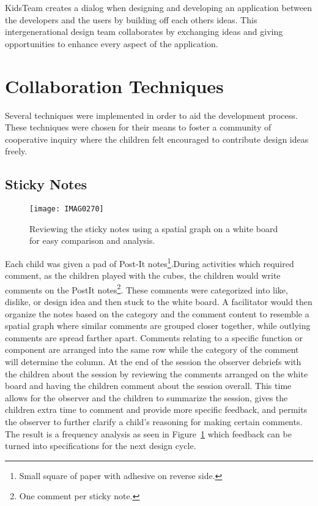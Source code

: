 KidsTeam creates a dialog when designing and developing an application between the developers and the users by building off each others ideas. This intergenerational design team collaborates by exchanging ideas and giving opportunities to enhance every aspect of the application. 


\section{Collaboration Techniques}
Several techniques were implemented in order to aid the development process. These techniques were chosen for their means to foster a community of cooperative inquiry where the children felt encouraged to contribute design ideas freely. \cite{journalsjcalScottMI03}\cite{Colella98}


\subsection{Sticky Notes}\label{sec:stickynotes}

\begin{figure}
\centering
\texttt{[image: IMAG0270]}
\caption{Reviewing the sticky notes using a spatial graph on a white board for easy comparison and analysis. }
\label{fig:stickynotesreview}
\end{figure}

Each child was given a pad of Post-It notes\footnote{Small square of paper with adhesive on reverse side.}.During activities which required comment, as the children played with the cubes, the children would write comments on the PostIt notes\footnote{One comment per sticky note.}. These comments were categorized into like, dislike, or design idea and then stuck to the white board. A facilitator would then organize the notes based on the category and the comment content to resemble a spatial graph where similar comments are grouped closer together, while outlying comments are spread farther apart. Comments relating to a specific function or component are arranged into the same row while the category of the comment will determine the column. At the end of the session the observer debriefs with the children about the session by reviewing the comments arranged on the white board and having the children comment about the session overall. This time allows for the observer and the children to summarize the session, gives the children extra time to comment and provide more specific feedback, and permits the observer to further clarify a child's reasoning for making certain comments. The result is a frequency analysis as seen in Figure~\ref{fig:stickynotesreview} which feedback can be turned into specifications for the next design cycle.  \cite{Druin:1999:CID:302979.303166}\cite{Druin02therole} 

